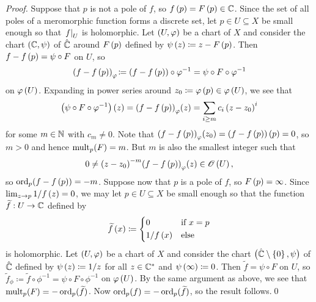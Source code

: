 \documentclass[../Moduli_Spaces_of_Riemann_Surfaces.tex]{subfiles}
\begin{document}
    \begin{proof}
        Suppose that $p$ is not a pole of $f$, so $f\left(p\right)=F\left(p\right)\in\mathbb{C}$. Since the set of all poles of a meromorphic function forms a discrete set, let $p\in U\subseteq X$ be small enough so that $\left.f\right|_U$ is holomorphic. Let $\left(U,\varphi\right)$ be a chart of $X$ and consider the chart $\left(\mathbb{C},\psi\right)$ of $\hat{\mathbb{C}}$ around $F\left(p\right)$ defined by $\psi\left(z\right)\coloneqq z-F\left(p\right)$. Then $f-f\left(p\right)=\psi\circ F$ on $U$, so
        \begin{equation*}
            \left(f-f\left(p\right)\right)_\varphi\!\coloneqq\left(f-f\left(p\right)\right)\circ\varphi^{-1}=\psi\circ F\circ\varphi^{-1}
        \end{equation*}
        on $\varphi\left(U\right)$. Expanding in power series around $z_0\coloneqq\varphi\left(p\right)\in\varphi\left(U\right)$, we see that
        \begin{equation*}
            \left(\psi\circ F\circ\varphi^{-1}\right)\left(z\right)=\left(f-f\left(p\right)\right)_\varphi\!\left(z\right)=\sum_{i\geq m}c_i\left(z-z_0\right)^i
        \end{equation*}
        for some $m\in\mathbb{N}$ with $c_m\neq0$. Note that $\left(f-f\left(p\right)\right)_\varphi\!\left(z_0\right)=\left(f-f\left(p\right)\right)\left(p\right)=0$, so $m>0$ and hence $\operatorname{mult}_p\!\left(F\right)=m$. But $m$ is also the smallest integer such that
        \begin{equation*}
            0\neq\left(z-z_0\right)^{-m}\!\left(f-f\left(p\right)\right)_\varphi\!\left(z\right)\in\mathscr{O}\left(U\right),
        \end{equation*}
        so $\operatorname{ord}_p\!\left(f-f\left(p\right)\right)=-m$. Suppose now that $p$ is a pole of $f$, so $F\left(p\right)=\infty$. Since $\lim_{z\to p}1/f\left(z\right)=0$, we may let $p\in U\subseteq X$ be small enough so that the function $\widetilde{f}:U\to\mathbb{C}$ defined by
        \begin{equation*}
            \widetilde{f}\left(x\right)\coloneqq
            \begin{dcases}
                0 & \textrm{if }x=p \\
                1/f\left(x\right) & \textrm{else}
            \end{dcases}
        \end{equation*}
        is holomorphic. Let $\left(U,\varphi\right)$ be a chart of $X$ and consider the chart $\big(\hat{\mathbb{C}}\setminus\left\{0\right\},\psi\big)$ of $\hat{\mathbb{C}}$ defined by $\psi\left(z\right)\coloneqq1/z$ for all $z\in\mathbb{C}^\ast$ and $\psi\left(\infty\right)\coloneqq0$. Then $\widetilde{f}=\psi\circ F$ on $U$, so $\widetilde{f}_\phi\!\coloneqq\widetilde{f}\circ\phi^{-1}=\psi\circ F\circ\phi^{-1}$ on $\varphi\left(U\right)$. By the same argument as above, we see that $\operatorname{mult}_p\!\left(F\right)=-\operatorname{ord}_p(\widetilde{f})$. Now $\operatorname{ord}_p\!\left(f\right)=-\operatorname{ord}_p(\widetilde{f})$, so the result follows.\qed
    \end{proof}
\end{document}
